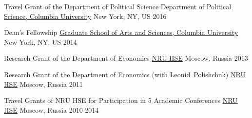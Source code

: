 



\begin{cvhonors}

  \cvhonor
    {Travel Grant of the Department of Political Science} %
    {\href{http://polisci.columbia.edu/}{Department of Political Science, Columbia University}} %
    {New York, NY, US} %
    {2016} %

  \cvhonor
    {Dean's Fellowship} %
    {\href{http://gsas.columbia.edu/content/fellowship-categories}{Graduate School of Arts and Sciences, Columbia University}} %
    {New York, NY, US} %
    {2014} %

  \cvhonor
    {Research Grant of the Department of Economics} %
    {\href{http://www.hse.ru/en/}{NRU HSE}} %
    {Moscow, Russia} %
    {2013} %

  \cvhonor
    {Research Grant of the Department of Economics (with Leonid~Polishchuk)} %
    {\href{http://www.hse.ru/en/}{NRU HSE}} %
    {Moscow, Russia} %
    {2011} %

  \cvhonor
    {Travel Grants of NRU HSE for Participation in 5 Academic Conferences} %
    {\href{http://www.hse.ru/en/}{NRU HSE}} %
    {Moscow, Russia} %
    {2010-2014} %

\end{cvhonors}






